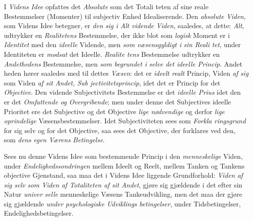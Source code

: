 I \emph{Videns Idee} opfattes det \emph{Absolute} som det Totali\-%
teten af sine reale Bestemmelser (Momenter) til subjectiv
Enhed Idealiserende. Den \emph{absolute Viden}, som Videns
Idee betegner, er \emph{den sig i Alt vidende Viden}, saaledes,
at dette: \emph{Alt}, udtrykker en \emph{Realitetens} Bestemmelse, der
ikke blot som \emph{logisk} Moment er i \emph{Identitet} med den
\emph{ideelle} Vidende, men \emph{som væsensgyldigt i sin Reali\-%
tet}, under Identiteten er \emph{modsat} det Ideelle. \emph{Realite\-%
tens} Bestemmelse udtrykker en \emph{Andethedens} Bestemmelse,
men \emph{som begrundet i selve det ideelle Princip}. Andet\-%
heden hører saaledes med til dettes \emph{Væsen}: det er \emph{ideelt\-%
realt} Princip, Viden \emph{af sig} som Viden \emph{af sit Andet, Sub\-%
jectivitetsprincip}, idet det er Princip for det \emph{Objective}.
Den vidende Subjectivitets Bestemmelse er det \emph{ideelle Prius}
idet den er det \emph{Omfattende og Overgribende}; men under
denne det Subjectives ideelle Prioritet ere det Subjective og
det Objective \emph{lige nødvendige} og derfor \emph{lige oprindelige}
Væsensbestemmelser. Idet Subjectiviteten sees som \emph{Forkla\-%
ringsgrund} for sig selv og for det Objective, saa sees det
Objective, der forklares ved den, som \emph{dens egen Værens
Betingelse}.

Sees nu denne Videns Idee som bestemmende Princip i
den \emph{menneskelige} Viden, under \emph{Endelighedssondringen}
mellem Ideelt og Reelt, mellem Tanken og Tankens objective
Gjenstand, saa maa det i Videns Idee liggende Grundforhold:
\emph{Viden af sig selv som Viden af Totaliteten af sit
Andet}, gjøre sig gjældende i det efter sin Natur \emph{univer\-%
selle} menneskelige Væsens Tankeudvikling, men det maa der
 gjøre sig gjældende \emph{under psychologiske Udviklings\-%
betingelser}, under Tidsbetingelser, Endelighedsbetingelser.

